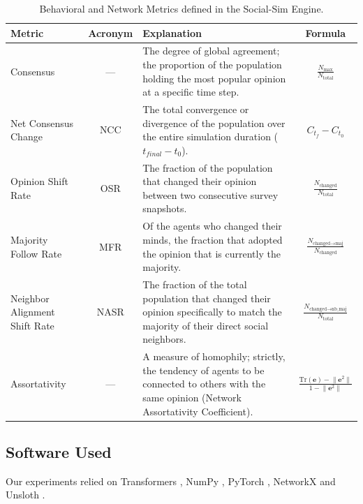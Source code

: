 \documentclass{article} %
\begin{document}
\begin{table}[h]
\centering
\small
\begin{tabular}{|l|c|p{5cm}|c|}
\hline
\textbf{Metric} & \textbf{Acronym} & \textbf{Explanation} & \textbf{Formula} \\ \hline
Consensus & --- & The degree of global agreement; the proportion of the population holding the most popular opinion at a specific time step. & $\frac{N_{\max}}{N_{\text{total}}}$ \\ \hline
Net Consensus Change & NCC & The total convergence or divergence of the population over the entire simulation duration ($t_{final} - t_{0}$). & $C_{t_f} - C_{t_0}$ \\ \hline
Opinion Shift Rate & OSR & The fraction of the population that changed their opinion between two consecutive survey snapshots. & $\frac{N_{\text{changed}}}{N_{\text{total}}}$ \\ \hline
Majority Follow Rate & MFR & Of the agents who changed their minds, the fraction that adopted the opinion that is currently the majority. & $\frac{N_{\text{changed} \to \text{maj}}}{N_{\text{changed}}}$ \\ \hline
Neighbor Alignment Shift Rate & NASR & The fraction of the total population that changed their opinion specifically to match the majority of their direct social neighbors. & $\frac{N_{\text{changed} \to \text{nb\_maj}}}{N_{\text{total}}}$ \\ \hline
Assortativity & --- & A measure of homophily; strictly, the tendency of agents to be connected to others with the same opinion (Network Assortativity Coefficient). & $\frac{\text{Tr}(\mathbf{e}) - \lVert \mathbf{e}^2 \rVert}{1 - \lVert \mathbf{e}^2 \rVert}$ \\ \hline
\end{tabular}
\caption{Behavioral and Network Metrics defined in the Social-Sim Engine.}
\label{tab:metrics_definitions}
\end{table}

\subsection{Software Used}

Our experiments relied on Transformers \citep{wolf-etal-2020-transformers}, NumPy \citep{harris2020array}, PyTorch \citep{Ansel_PyTorch_2_Faster_2024}, NetworkX \citep{hagberg2008networkx} and Unsloth \citep{unsloth}.
\end{document}
